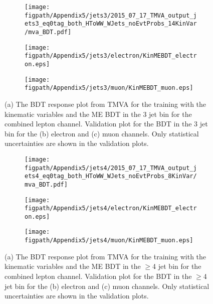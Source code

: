\begin{figure}[!hbt]
    \centering
    \begin{subfigure}[t]{0.317\textwidth}
        \texttt{[image: \\figpath/Appendix5/jets3/2015\_07\_17\_TMVA\_output\_jets3\_eq0tag\_both\_HToWW\_WJets\_noEvtProbs\_14KinVar/mva\_BDT.pdf]}
        \caption{}
        \label{fig:KinMEBDT_Response_3j0B_TMVA}
    \end{subfigure}
    \begin{subfigure}[t]{0.317\textwidth}
        \texttt{[image: \\figpath/Appendix5/jets3/electron/KinMEBDT\_electron.eps]}
        \caption{}
        \label{fig:KinMEBDT_jets3_electron_noSys}
    \end{subfigure}
    \begin{subfigure}[t]{0.317\textwidth}
        \texttt{[image: \\figpath/Appendix5/jets3/muon/KinMEBDT\_muon.eps]}
        \caption{}
        \label{fig:KinMEBDT_jets3_muon_noSys}
    \end{subfigure}
    \caption{(a) The BDT response plot from TMVA for the training with the kinematic variables and the ME BDT in the 3 jet bin for the combined lepton channel. Validation plot for the BDT in the 3 jet bin for the (b) electron and (c) muon channels. Only statistical uncertainties are shown in the validation plots.}
    \label{fig:KinMEBDT_Comparison_jets3}
\end{figure}

\begin{figure}[!hbt]
    \centering
    \begin{subfigure}[t]{0.317\textwidth}
        \texttt{[image: \\figpath/Appendix5/jets4/2015\_07\_17\_TMVA\_output\_jets4\_eq0tag\_both\_HToWW\_WJets\_noEvtProbs\_8KinVar/mva\_BDT.pdf]}
        \caption{}
        \label{fig:KinMEBDT_Response_4j0B_TMVA}
    \end{subfigure}
    \begin{subfigure}[t]{0.317\textwidth}
        \texttt{[image: \\figpath/Appendix5/jets4/electron/KinMEBDT\_electron.eps]}
        \caption{}
        \label{fig:KinMEBDT_jets4_electron_noSys}
    \end{subfigure}
    \begin{subfigure}[t]{0.317\textwidth}
        \texttt{[image: \\figpath/Appendix5/jets4/muon/KinMEBDT\_muon.eps]}
        \caption{}
        \label{fig:KinMEBDT_jets4_muon_noSys}
    \end{subfigure}
    \caption{(a) The BDT response plot from TMVA for the training with the kinematic variables and the ME BDT in the $\geqslant$4 jet bin for the combined lepton channel. Validation plot for the BDT in the $\geqslant$4 jet bin for the (b) electron and (c) muon channels. Only statistical uncertainties are shown in the validation plots.}
    \label{fig:KinMEBDT_Comparison_jets4}
\end{figure}
\clearpage







